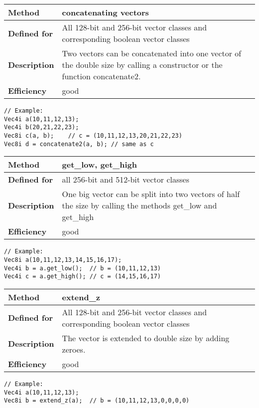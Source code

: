 \documentclass[vcl_manual.tex]{subfiles}
\begin{document}
\begin{tabular}{|p{30mm}|p{120mm}|}
\hline
\bfseries Method & concatenating vectors \\ \hline
\bfseries Defined for & All 128-bit and 256-bit vector classes and corresponding boolean vector classes \\ \hline
\bfseries Description & Two vectors can be concatenated into one vector of the double size by calling a constructor or the function concatenate2. \\ \hline
\bfseries Efficiency & good \\ \hline
\end{tabular}
\begin{lstlisting}[frame=none]
// Example:
Vec4i a(10,11,12,13);
Vec4i b(20,21,22,23);
Vec8i c(a, b);    // c = (10,11,12,13,20,21,22,23)
Vec8i d = concatenate2(a, b); // same as c
\end{lstlisting}


\begin{tabular}{|p{30mm}|p{120mm}|}
\hline
\bfseries Method & get\_low, get\_high \\ \hline
\bfseries Defined for & all 256-bit and 512-bit vector classes \\ \hline
\bfseries Description & One big vector can be split into two vectors of half the size by calling the methods get\_low and get\_high \\ \hline
\bfseries Efficiency & good \\ \hline
\end{tabular}
\begin{lstlisting}[frame=none]
// Example:
Vec8i a(10,11,12,13,14,15,16,17);
Vec4i b = a.get_low();  // b = (10,11,12,13)
Vec4i c = a.get_high(); // c = (14,15,16,17)
\end{lstlisting}


\begin{tabular}{|p{30mm}|p{120mm}|}
\hline
\bfseries Method & extend\_z \\ \hline
\bfseries Defined for & All 128-bit and 256-bit vector classes and corresponding boolean vector classes \\ \hline
\bfseries Description & The vector is extended to double size by adding zeroes. \\ \hline
\bfseries Efficiency & good \\ \hline
\end{tabular}
\begin{lstlisting}[frame=none]
// Example:
Vec4i a(10,11,12,13);
Vec8i b = extend_z(a);  // b = (10,11,12,13,0,0,0,0)
\end{lstlisting}
\end{document}
